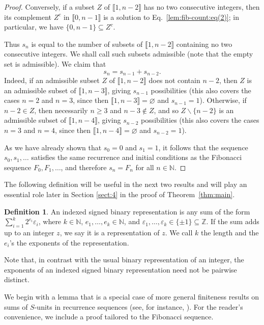 \documentclass[11pt,reqno]{amsart}
\theoremstyle{definition}
\newtheorem{definition}[theorem]{Definition}
\theoremstyle{remark}
\theoremstyle{theoremdd}
\providecommand\llb{\llbracket}
\providecommand\rrb{\rrbracket}
\newcommand{\evid}[1]{\textsf{#1}}
\providecommand\llb{\llbracket}
\providecommand\rrb{\rrbracket}
\renewcommand{\emptyset}{\varnothing}
\renewcommand{\setminus}{\smallsetminus}
\renewcommand{\,}{\kern 0.1em}
\begin{document}
\begin{proof}
Conversely, if a subset $Z$ of $\llb 1,n-2 \rrb$ has no two
consecutive integers, then its complement $Z^c$ in $\llb 0,n-1 \rrb$ is a solution to Eq.~\eqref{lem:fib-count:eq(2)}; in particular, we have $\{0,n-1\} \subseteq Z^c$.

Thus $s_n$ is equal to the number of subsets of $\llb 1, n-2 \rrb$
containing no two consecutive integers. We shall call such subsets
\evid{admissible} (note that the empty set is admissible). We claim that
\[
s_n = s_{n-1} + s_{n-2}.
\]
Indeed, if an admissible subset $Z$ of $\llb 1,n-2 \rrb$ does not contain $n-2$, then $Z$ is an admissible subset of $\llb 1, n-3 \rrb$, giving $s_{n-1}$ possibilities (this also covers the cases $n = 2$ and $n = 3$, since then $\llb 1, n-3 \rrb = \emptyset$ and $s_{n-1} = 1$). 
Otherwise, if $n-2 \in Z$, then necessarily $n \ge 3$ and $n-3 \notin Z$, and so $Z \setminus \{n-2\}$ is an admissible subset of $\llb 1, n-4 \rrb$, giving $s_{n-2}$ possibilities (this also covers
the cases $n=3$ and $n=4$, since then $\llb 1,n-4 \rrb=\emptyset$ and $s_{n-2}=1$).

As we have already shown that $s_0 = 0$ and $s_1 = 1$, it follows that the 
sequence $s_0, s_1, \dots$ satisfies the same recurrence and initial conditions 
as the Fibonacci sequence $F_0, F_1, \dots$, and therefore $s_n = F_n$ for all 
$n \in \mathbb{N}$.
\end{proof}

The following definition will be useful in the next two results and will
play an essential role later in Section \ref{sect:4} in the proof of Theorem~\ref{thm:main}.

\begin{definition}
\label{def:indexed-signed-bin-rep}
An \evid{indexed signed binary representation} is any sum of the form $\sum_{i=1}^k 2^{e_i} \varepsilon_i$,
where $k \in \mathbb N$,
$e_1, \ldots, e_k \in \mathbb N$, and $\varepsilon_1, \ldots, \varepsilon_k \in \{\pm 1\} \subseteq \mathbb Z$. If the sum adds up to an integer $z$, we say it is a representation of $z$. We call $k$ the
\evid{length} and the $e_i$'s the \evid{exponents} of the representation.
\end{definition}


Note that, in contrast with the usual binary representation of an integer, the exponents
of an indexed signed binary representation need not be pairwise distinct.

We begin with a lemma that is a special case of more general finiteness results on sums of $S$-units in recurrence sequences (see, for instance, \cite[Theorem~2.1]{ber-haj-pin-rou-2019}). For the reader's convenience, we include a proof tailored to the Fibonacci sequence.
\end{document}
